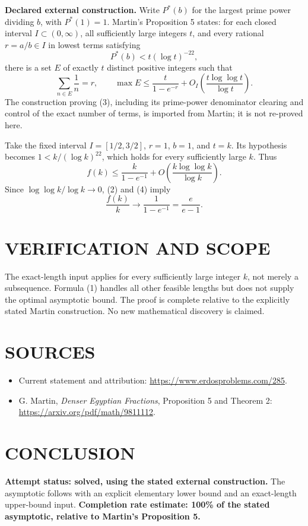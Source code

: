 \textbf{Declared external construction.} Write $P^*(b)$ for the largest prime power dividing $b$, with $P^*(1)=1$. Martin's Proposition 5 states: for each closed interval $I\subset(0,\infty)$, all sufficiently large integers $t$, and every rational $r=a/b\in I$ in lowest terms satisfying
\[
P^*(b)<t(\log t)^{-22},
\]
there is a set $E$ of exactly $t$ distinct positive integers such that
\[
\sum_{n\in E}\frac1n=r,\qquad
\max E\leq\frac{t}{1-e^{-r}}+O_I\!\left(\frac{t\log\log t}{\log t}\right).
\tag{3}
\]
The construction proving (3), including its prime-power denominator clearing and control of the exact number of terms, is imported from Martin; it is not re-proved here.

Take the fixed interval $I=[1/2,3/2]$, $r=1$, $b=1$, and $t=k$. Its hypothesis becomes $1<k/(\log k)^{22}$, which holds for every sufficiently large $k$. Thus
\[
f(k)\leq\frac{k}{1-e^{-1}}
+O\!\left(\frac{k\log\log k}{\log k}\right).
\tag{4}
\]
Since $\log\log k/\log k\to0$, (2) and (4) imply
\[
\frac{f(k)}k\longrightarrow\frac1{1-e^{-1}}=\frac e{e-1}.
\]

\section{VERIFICATION AND SCOPE}
The exact-length input applies for every sufficiently large integer $k$, not merely a subsequence. Formula (1) handles all other feasible lengths but does not supply the optimal asymptotic bound. The proof is complete relative to the explicitly stated Martin construction. No new mathematical discovery is claimed.

\section{SOURCES}
\begin{itemize}
\item Current statement and attribution: \url{https://www.erdosproblems.com/285}.
\item G. Martin, \emph{Denser Egyptian Fractions}, Proposition 5 and Theorem 2: \url{https://arxiv.org/pdf/math/9811112}.
\end{itemize}
\section{CONCLUSION}
\textbf{Attempt status: solved, using the stated external construction.}
The asymptotic follows with an explicit elementary lower bound and an exact-length upper-bound input.
\textbf{Completion rate estimate: 100\% of the stated asymptotic, relative to Martin's Proposition 5.}
